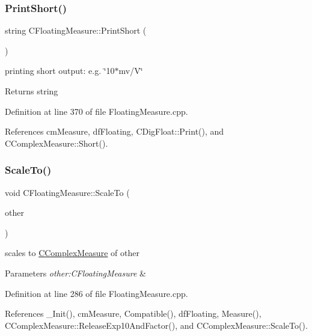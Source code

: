 \subsubsection{\texorpdfstring{Print\+Short()}{PrintShort()}}
{\footnotesize\ttfamily string C\+Floating\+Measure\+::\+Print\+Short (\begin{DoxyParamCaption}{ }\end{DoxyParamCaption})}



printing short output\+: e.\+g. \char`\"{}10$\ast$mv/\+V\char`\"{} 

\begin{DoxyReturn}{Returns}
string 
\end{DoxyReturn}


Definition at line 370 of file Floating\+Measure.\+cpp.



References cm\+Measure, df\+Floating, C\+Dig\+Float\+::\+Print(), and C\+Complex\+Measure\+::\+Short().

\mbox{\label{classCFloatingMeasure_aa0a16f8516d047576b588389504c0996}} 
\subsubsection{\texorpdfstring{Scale\+To()}{ScaleTo()}\hspace{0.1cm}{\footnotesize\ttfamily [1/2]}}
{\footnotesize\ttfamily void C\+Floating\+Measure\+::\+Scale\+To (\begin{DoxyParamCaption}\item[{const \hyperlink{classCFloatingMeasure}{C\+Floating\+Measure} \&}]{other }\end{DoxyParamCaption})}



scales to \hyperlink{classCComplexMeasure}{C\+Complex\+Measure} of other 


\begin{DoxyParams}{Parameters}
{\em other\+:\+C\+Floating\+Measure} & \\
\hline
\end{DoxyParams}


Definition at line 286 of file Floating\+Measure.\+cpp.



References \+\_\+\+Init(), cm\+Measure, Compatible(), df\+Floating, Measure(), C\+Complex\+Measure\+::\+Release\+Exp10\+And\+Factor(), and C\+Complex\+Measure\+::\+Scale\+To().

